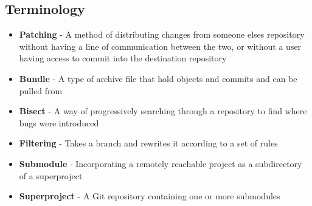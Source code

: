 \subsection{Terminology}
\begin{itemize}
\item\textbf{Patching} - A method of distributing changes from someone elses repository without having a line of communication between the two,
or without a user having access to commit into the destination repository
\item\textbf{Bundle} - A type of archive file that hold objects and commits and can be pulled from
\item\textbf{Bisect} - A way of progressively searching through a repository to find where bugs were introduced
\item\textbf{Filtering} - Takes a branch and rewrites it according to a set of rules
\item\textbf{Submodule} - Incorporating a remotely reachable project as a subdirectory of a superproject
\item\textbf{Superproject} - A Git repository containing one or more submodules
\end{itemize}
